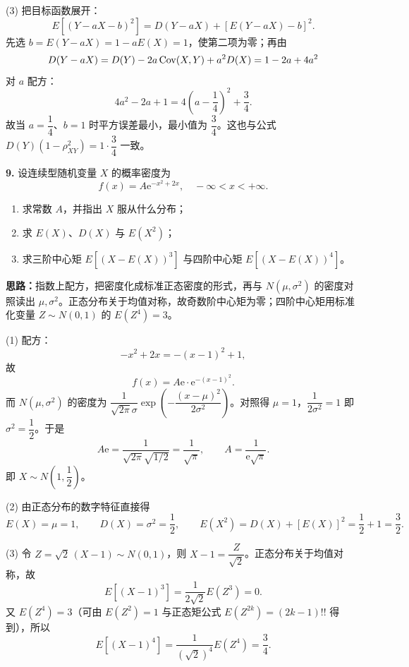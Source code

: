 (3) 把目标函数展开：
\[
E[(Y-aX-b)^2]=D(Y-aX)+[E(Y-aX)-b]^2.
\]
先选 $b=E(Y-aX)=1-aE(X)=1$，使第二项为零；再由
\[
D(Y-aX)=D(Y)-2a\operatorname{Cov}(X,Y)+a^2D(X)=1-2a+4a^2
\]
对 $a$ 配方：
\[
4a^2-2a+1=4\left(a-\frac14\right)^2+\frac34.
\]
故当 $a=\dfrac14$、$b=1$ 时平方误差最小，最小值为 $\dfrac34$。这也与公式 $D(Y)(1-\rho_{XY}^2)=1\cdot\dfrac34$ 一致。


\else \answerarea[10] \fi

\textbf{9.} 设连续型随机变量 $X$ 的概率密度为
\[
f(x)=A\mathrm{e}^{-x^2+2x},\quad -\infty<x<+\infty.
\]
\begin{enumerate}[label=(\arabic*)]
    \item 求常数 $A$，并指出 $X$ 服从什么分布；
    \item 求 $E(X)$、$D(X)$ 与 $E(X^2)$；
    \item 求三阶中心矩 $E[(X-E(X))^3]$ 与四阶中心矩 $E[(X-E(X))^4]$。
\end{enumerate}

\ifshowsolutions%
\textbf{思路：}指数上配方，把密度化成标准正态密度的形式，再与 $N(\mu,\sigma^2)$ 的密度对照读出 $\mu,\sigma^2$。正态分布关于均值对称，故奇数阶中心矩为零；四阶中心矩用标准化变量 $Z\sim N(0,1)$ 的 $E(Z^4)=3$。

(1) 配方：
\[
-x^2+2x=-(x-1)^2+1,
\]
故
\[
f(x)=A\mathrm{e}\cdot \mathrm{e}^{-(x-1)^2}.
\]
而 $N(\mu,\sigma^2)$ 的密度为 $\dfrac{1}{\sqrt{2\pi}\sigma}\exp\left(-\dfrac{(x-\mu)^2}{2\sigma^2}\right)$。对照得 $\mu=1$，$\dfrac{1}{2\sigma^2}=1$ 即 $\sigma^2=\dfrac12$。于是
\[
A\mathrm{e}=\frac{1}{\sqrt{2\pi}\sqrt{1/2}}=\frac{1}{\sqrt{\pi}},
\qquad A=\frac{1}{\mathrm{e}\sqrt{\pi}}.
\]
即 $X\sim N\!\left(1,\dfrac12\right)$。

(2) 由正态分布的数字特征直接得
\[
E(X)=\mu=1,\qquad D(X)=\sigma^2=\frac12,\qquad E(X^2)=D(X)+[E(X)]^2=\frac12+1=\frac32.
\]

(3) 令 $Z=\sqrt2\,(X-1)\sim N(0,1)$，则 $X-1=\dfrac{Z}{\sqrt2}$。正态分布关于均值对称，故
\[
E[(X-1)^3]=\frac{1}{2\sqrt2}E(Z^3)=0.
\]
又 $E(Z^4)=3$（可由 $E(Z^2)=1$ 与正态矩公式 $E(Z^{2k})=(2k-1)!!$ 得到），所以
\[
E[(X-1)^4]=\frac{1}{(\sqrt2)^4}E(Z^4)=\frac{3}{4}.
\]


